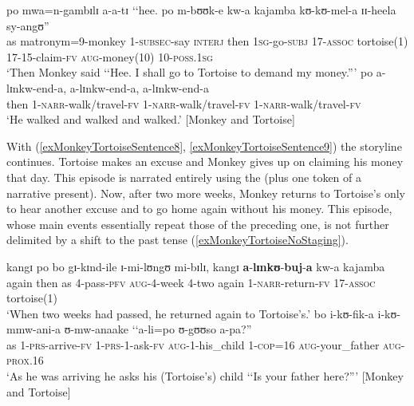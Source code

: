 \begin{exe}
\begin{xlist}
\ex \label{exMonkeyTortoiseSentence8} \gll po mwa=n-gambɪlɪ a-a-tɪ \textup{\lq\lq}hee. po m-bʊʊk-e kw-a kajamba kʊ-kʊ-mel-a ɪɪ-heela sy-angʊ\textup{''}\\
as matronym=9-monkey 1-\textsc{subsec}-say \phantom{\lq\lq}\textsc{interj} then \textsc{1sg}-go-\textsc{subj} 17-\textsc{assoc} tortoise(1) 17-15-claim-\textsc{fv} \textsc{aug}-money(10) 10-\textsc{poss.1sg}\\
\glt \lq Then Monkey said \lq\lq Hee. ‎‎I shall go to Tortoise to demand my money.''{}'
\ex \label{exMonkeyTortoiseSentence9} \gll po a-lɪnkw-end-a, a-lɪnkw-end-a, a-lɪnkw-end-a\\
then 1-\textsc{narr}-walk/travel-\textsc{fv} 1-\textsc{narr}-walk/travel-\textsc{fv} 1-\textsc{narr}-walk/travel-\textsc{fv}\\
\glt \lq He walked and walked and walked.' [Monkey and Tortoise]
\end{xlist}
\end{exe}

\largerpage
With (\ref{exMonkeyTortoiseSentence8}, \ref{exMonkeyTortoiseSentence9}) the storyline continues. Tortoise makes an excuse and Monkey gives up on claiming his money that day. This episode is narrated entirely using the  (plus one token of a narrative present). Now, after two more weeks, Monkey returns to Tortoise's only to hear another excuse and to go home again without his money. This episode, whose main events essentially repeat those of the preceding one, is not further delimited by a shift to the past tense (\ref{exMonkeyTortoiseNoStaging}).

\begin{exe}
\ex \label{exMonkeyTortoiseNoStaging}
\begin{xlist}
\ex \label{exMonkeyTortoiseNoStagingSentence1} \gll kangɪ po bo gɪ-kɪnd-ile ɪ-mi-lʊngʊ mi-bɪlɪ, kangɪ \textbf{a}-\textbf{lɪnkʊ}-\textbf{buj}-\textbf{a} kw-a kajamba\\
again then as 4-pass-\textsc{pfv} \textsc{aug}-4-week 4-two again 1-\textsc{narr}-return-\textsc{fv} 17-\textsc{assoc} tortoise(1)\\
\glt \lq When two weeks had passed, he returned again to Tortoise's.'
\ex \gll bo i-kʊ-fik-a i-kʊ-mmw-ani-a ʊ-mw-anaake \lq\lq a-li=po ʊ-gʊʊso a-pa?''\\
as 1-\textsc{prs}-arrive-\textsc{fv} 1-\textsc{prs}-1-ask-\textsc{fv} \textsc{aug}-1-his\_child \phantom{\lq\lq}1-\textsc{cop}=16 \textsc{aug}-your\_father \textsc{aug}-\textsc{prox.16} \\
\glt \lq As he was arriving he asks his (Tortoise's) child \lq\lq Is your father here?''{}' [Monkey and Tortoise]
\end{xlist}
\end{exe}

